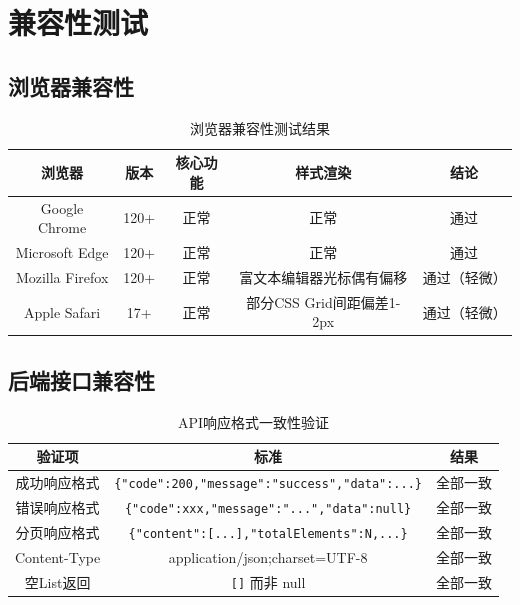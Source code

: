 
\section{兼容性测试}

\subsection{浏览器兼容性}

\begin{table}[htbp]
    \centering
    \caption{浏览器兼容性测试结果}
    \begin{tabular}{|c|c|c|c|c|}
        \hline
        \textbf{浏览器} & \textbf{版本} & \textbf{核心功能} & \textbf{样式渲染} & \textbf{结论} \\
        \hline
        Google Chrome & 120+ & 正常 & 正常 & 通过 \\
        \hline
        Microsoft Edge & 120+ & 正常 & 正常 & 通过 \\
        \hline
        Mozilla Firefox & 120+ & 正常 & 富文本编辑器光标偶有偏移 & 通过（轻微） \\
        \hline
        Apple Safari & 17+ & 正常 & 部分CSS Grid间距偏差1-2px & 通过（轻微） \\
        \hline
    \end{tabular}
\end{table}

\subsection{后端接口兼容性}

\begin{table}[htbp]
    \centering
    \caption{API响应格式一致性验证}
    \begin{tabular}{|c|c|c|}
        \hline
        \textbf{验证项} & \textbf{标准} & \textbf{结果} \\
        \hline
        成功响应格式 & \texttt{\{"code":200,"message":"success","data":...\}} & 全部一致 \\
        \hline
        错误响应格式 & \texttt{\{"code":xxx,"message":"...","data":null\}} & 全部一致 \\
        \hline
        分页响应格式 & \texttt{\{"content":[...],"totalElements":N,...\}} & 全部一致 \\
        \hline
        Content-Type & application/json;charset=UTF-8 & 全部一致 \\
        \hline
        空List返回 & \texttt{[]} 而非 null & 全部一致 \\
        \hline
    \end{tabular}
\end{table}

